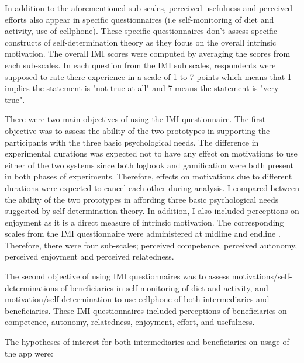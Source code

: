 In addition to the aforementioned sub-scales, perceived usefulness and perceived efforts also appear in specific questionnaires (i.e self-monitoring of diet and activity, use of cellphone). These specific questionnaires don't assess specific constructs of self-determination theory as they focus on the overall intrinsic motivation. 
The overall IMI scores were computed by averaging the scores from each sub-scales. In each question from the IMI sub scales, respondents were supposed to rate there experience in a scale of 1 to 7 points which means that 1 implies the statement is "not true at all" and 7 means the statement is "very true".

There were two main objectives of using the IMI questionnaire. The first objective was to assess the ability of the two prototypes in supporting the participants with the three basic psychological needs. The difference in experimental durations was expected not to have any effect on motivations to use either of the two systems since both logbook and gamification were both present in both phases of experiments. Therefore, effects on motivations due to different durations were expected to cancel each other during analysis. I compared between the ability of the two prototypes in affording three basic psychological needs suggested by self-determination theory. In addition, I also included perceptions on enjoyment as it is a direct measure of intrinsic motivation. The corresponding scales from the IMI questionnaire were administered at midline and endline . Therefore, there were four sub-scales; perceived competence, perceived autonomy, perceived enjoyment and perceived relatedness. 

The second objective of using IMI questionnaires was to assess motivations/self-determinations of beneficiaries in self-monitoring of diet and activity, and motivation/self-determination to use cellphone of both intermediaries and beneficiaries. These IMI questionnaires included perceptions of beneficiaries on competence, autonomy, relatedness, enjoyment, effort, and usefulness.

The hypotheses of interest for both intermediaries and beneficiaries on usage of the app were:


